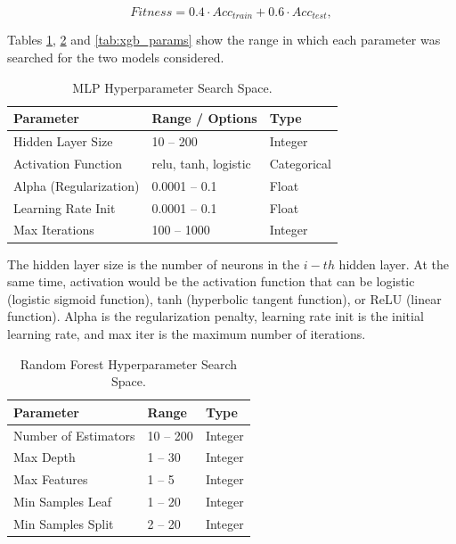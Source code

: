 \documentclass{ieeeaccess}
\begin{document}
\begin{equation}
\mathit{Fitness} = 0.4 \cdot \mathit{Acc_{train}} + 0.6 \cdot \mathit{Acc_{test}},
\label{eq:fitness}
\end{equation}

Tables \ref{tab:mlp_params}, \ref{tab:rf_params} and \ref{tab:xgb_params} show the range in which each parameter was searched for the two models considered.

\begin{table}
\caption{MLP Hyperparameter Search Space.}
\label{tab:mlp_params}
\setlength{\tabcolsep}{3pt}
\begin{tabular}{|p{95pt}|p{75pt}|p{55pt}|}
\hline
Parameter & Range / Options & Type \\
\hline
Hidden Layer Size & 10 -- 200 & Integer \\
Activation Function & relu, tanh, logistic & Categorical \\
Alpha (Regularization) & 0.0001 -- 0.1 & Float \\
Learning Rate Init & 0.0001 -- 0.1 & Float \\
Max Iterations & 100 -- 1000 & Integer \\
\hline
\end{tabular}
\end{table}

The hidden layer size is the number of neurons in the $i-th$ hidden layer. At the same time, activation would be the activation function that can be logistic (logistic sigmoid function), tanh (hyperbolic tangent function), or ReLU (linear function). Alpha is the regularization penalty, learning rate init is the initial learning rate, and max iter is the maximum number of iterations.

\begin{table}
\caption{Random Forest Hyperparameter Search Space.}
\label{tab:rf_params}
\setlength{\tabcolsep}{3pt}
\begin{tabular}{|p{95pt}|p{65pt}|p{60pt}|}
\hline
Parameter & Range & Type \\
\hline
Number of Estimators & 10 -- 200 & Integer \\
Max Depth & 1 -- 30 & Integer \\
Max Features & 1 -- 5 & Integer \\
Min Samples Leaf & 1 -- 20 & Integer \\
Min Samples Split & 2 -- 20 & Integer \\
\hline
\end{tabular}
\end{table}
\end{document}
